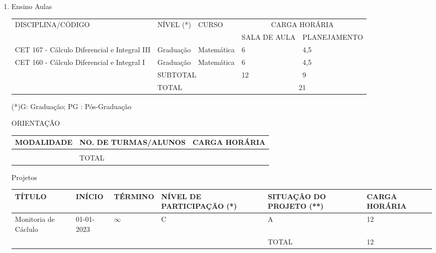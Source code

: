 \documentclass[a4paper]{article}
\begin{document}
\begin{enumerate}

	\item Ensino
	\subitem Aulas

		\begin{tabular}{|p{4cm}|p{2cm}|p{4cm}|p{1.8cm}|p{2cm}|}
			\hline
			\multirow{2}{*}{DISCIPLINA/CÓDIGO}			&\multirow{2}{*}{NÍVEL (*)}  &\multirow{2}{*}{CURSO } & 		\multicolumn{2}{c|}{CARGA HORÁRIA}			\\ \cline{4-5} 
														& 							 & 						  &	{\tiny SALA DE AULA}		&  {\tiny PLANEJAMENTO}	\\ \hline\hline
			CET 167 - Cálculo Diferencial e Integral III& Graduação					 & 	Matemática			  &	\hfil	6					& \hfil 	4,5			\\ \hline
			CET 160 - Cálculo Diferencial e Integral I	& Graduação					 & 	Matemática			  &	\hfil	6					& \hfil 	4,5			\\ \hline
			\multicolumn{1}{c|}{}	 					&\multicolumn{2}{l|}{SUBTOTAL} 						  &	\hfil	12					& \hfil		9			\\ \cline{2-5}
			\multicolumn{1}{c|}{}	 					&\multicolumn{2}{l|}{TOTAL} 						  &	\multicolumn{2}{c|}{21}  							\\ \cline{2-5}
		\end{tabular}

		(*)G:  Graduação; PG :  Pós-Graduação

	\subitem ORIENTAÇÃO

		\begin{tabular}{|p{5.7cm}|p{5cm}|p{4cm}|}
			\hline
			MODALIDADE				&  NO. DE TURMAS/ALUNOS	&CARGA HORÁRIA  \\ \hline \hline
									&  					    & 				\\	\hline
			\multicolumn{1}{c|}{}	& TOTAL 				&  				\\ \cline{2-3}
		\end{tabular}

	\subitem Projetos

		\begin{tabular}{|p{2.8cm}|p{1.4cm}|p{1.4cm}|p{3cm}|p{2.8cm}|p{2.0cm}|}
			\hline
			TÍTULO						    &  INÍCIO    	&TÉRMINO	&	NÍVEL DE PARTICIPAÇÃO (*) 	&  SITUAÇÃO DO PROJETO (**) & CARGA  HORÁRIA 		\\ \hline\hline
			Monitoria de Cáclulo			& 01-01-2023	&$\infty$	&			C					&			A	     		&\hfil 	12				\\ \hline
			\multicolumn{4}{c|}{}																		& TOTAL   					&\hfil		12			\\ \cline{5-6}
		\end{tabular}


\end{enumerate}
\end{document}
